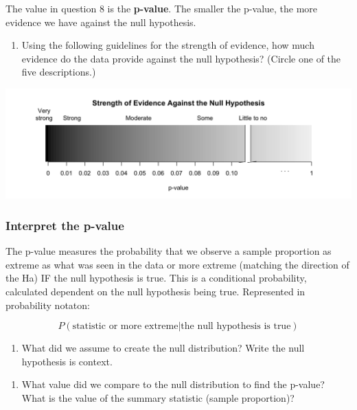 \documentclass[
]{report}
\providecommand{\tightlist}{%
  \setlength{\itemsep}{0pt}\setlength{\parskip}{0pt}}
\begin{document}
The value in question 8 is the \textbf{p-value}. The smaller the p-value, the more evidence we have against the null hypothesis.

\begin{enumerate}
\def\labelenumi{\arabic{enumi}.}
\setcounter{enumi}{8}
\tightlist
\item
  Using the following guidelines for the strength of evidence, how much evidence do the data provide against the null hypothesis? (Circle one of the five descriptions.)
\end{enumerate}

\begin{center}\includegraphics[width=0.9\linewidth]{images/soe_gradient_gray} \end{center}

\subsubsection*{Interpret the p-value}\label{interpret-the-p-value}

The p-value measures the probability that we observe a sample proportion as extreme as what was seen in the data or more extreme (matching the direction of the Ha) IF the null hypothesis is true. This is a conditional probability, calculated dependent on the null hypothesis being true. Represented in probability notaton:

\[P(\text{statistic or more extreme|the null hypothesis is true})\]

\begin{enumerate}
\def\labelenumi{\arabic{enumi}.}
\setcounter{enumi}{9}
\tightlist
\item
  What did we assume to create the null distribution? Write the null hypothesis is context.
\end{enumerate}

\vspace{0.7in}

\begin{enumerate}
\def\labelenumi{\arabic{enumi}.}
\setcounter{enumi}{10}
\tightlist
\item
  What value did we compare to the null distribution to find the p-value? What is the value of the summary statistic (sample proportion)?
\end{enumerate}
\end{document}
